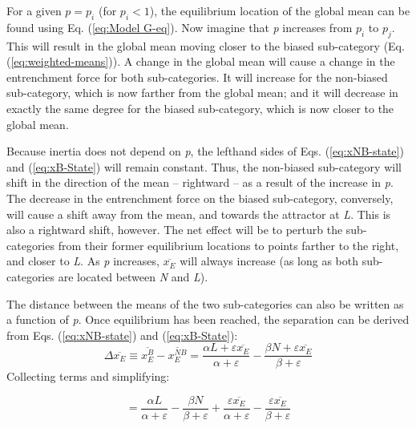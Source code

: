 For a given $p=p_{i}$ (for $p_{i}<1$), the equilibrium location
of the global mean can be found using Eq. (\ref{eq:Model G-eq}).
Now imagine that \emph{p} increases from $p_{i}$ to $p_{j}$. This will
result in the global mean moving closer to the biased sub-category
(Eq. (\ref{eq:weighted-means})). A change in the global mean will
cause a change in the entrenchment force for both sub-categories.
It will increase for the non-biased sub-category, which is now farther
from the global mean; and it will decrease in exactly the same degree
for the biased sub-category, which is now closer to the global mean.

Because inertia does not depend on \emph{p}, the lefthand sides of
Eqs. (\ref{eq:xNB-state}) and (\ref{eq:xB-State}) will remain constant.
Thus, the non-biased sub-category will shift in the direction of the
mean – rightward – as a result of the increase in \emph{p}. The decrease
in the entrenchment force on the biased sub-category, conversely,
will cause a shift away from the mean, and towards the attractor at
\emph{L}. This is also a rightward shift, however. The net effect
will be to perturb the sub-categories from their former equilibrium
locations to points farther to the right, and closer to \emph{L}.
As \emph{p} increases, $\overline{x_{E}}$ will always increase (as
long as both sub-categories are located between \emph{N} and \emph{L}).

The distance between the means of the two sub-categories can also
be written as a function of \emph{p}. Once equilibrium has been reached,
the separation can be derived from Eqs. (\ref{eq:xNB-state}) and
(\ref{eq:xB-State}):
\begin{equation}
\Delta\overline{x_{E}}\equiv\overline{x_{E}^{B}}-\overline{x_{E}^{NB}}=\frac{\alpha L+\varepsilon\overline{x_{E}}}{\alpha+\varepsilon}-\frac{\beta N+\varepsilon\overline{x_{E}}}{\beta+\varepsilon}
\end{equation}
Collecting terms and simplifying:

\begin{equation}
=\frac{\alpha L}{\alpha+\varepsilon}-\frac{\beta N}{\beta+\varepsilon}+\frac{\varepsilon\overline{x_{E}}}{\alpha+\varepsilon}-\frac{\varepsilon\overline{x_{E}}}{\beta+\varepsilon}
\end{equation}


